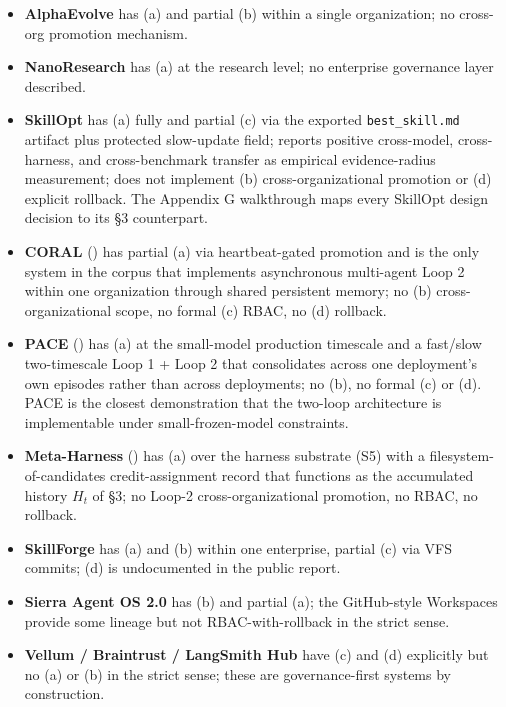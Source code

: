 \documentclass[
]{article}
\providecommand{\tightlist}{%
  \setlength{\itemsep}{0pt}\setlength{\parskip}{0pt}}
\begin{document}
\begin{itemize}
\tightlist
\item
  \textbf{AlphaEvolve} has (a) and partial (b) within a single
  organization; no cross-org promotion mechanism.
\item
  \textbf{NanoResearch} has (a) at the research level; no enterprise
  governance layer described.
\item
  \textbf{SkillOpt} has (a) fully and partial (c) via the exported
  \texttt{best\_skill.md} artifact plus protected slow-update field;
  reports positive cross-model, cross-harness, and cross-benchmark
  transfer as empirical evidence-radius measurement; does not implement
  (b) cross-organizational promotion or (d) explicit rollback. The
  Appendix G walkthrough maps every SkillOpt design decision to its §3
  counterpart.
\item
  \textbf{CORAL} () has
  partial (a) via heartbeat-gated promotion and is the only system in
  the corpus that implements asynchronous multi-agent Loop 2 within one
  organization through shared persistent memory; no (b)
  cross-organizational scope, no formal (c) RBAC, no (d) rollback.
\item
  \textbf{PACE} () has (a)
  at the small-model production timescale and a fast/slow two-timescale
  Loop 1 + Loop 2 that consolidates across one deployment's own episodes
  rather than across deployments; no (b), no formal (c) or (d). PACE is
  the closest demonstration that the two-loop architecture is
  implementable under small-frozen-model constraints.
\item
  \textbf{Meta-Harness} () has (a) over the harness substrate (S5) with a
  filesystem-of-candidates credit-assignment record that functions as
  the accumulated history \(H_t\) of §3; no Loop-2 cross-organizational
  promotion, no RBAC, no rollback.
\item
  \textbf{SkillForge} has (a) and (b) within one enterprise, partial (c)
  via VFS commits; (d) is undocumented in the public report.
\item
  \textbf{Sierra Agent OS 2.0} has (b) and partial (a); the GitHub-style
  Workspaces provide some lineage but not RBAC-with-rollback in the
  strict sense.
\item
  \textbf{Vellum / Braintrust / LangSmith Hub} have (c) and (d)
  explicitly but no (a) or (b) in the strict sense; these are
  governance-first systems by construction.
\end{itemize}
\end{document}
